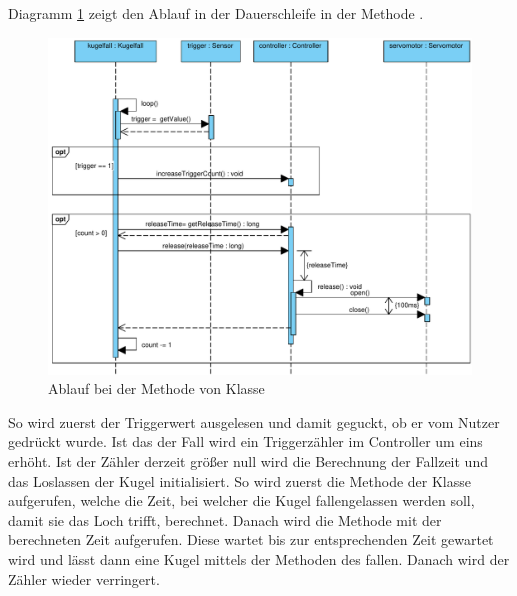 Diagramm \ref{fig:loop_diagram} zeigt den Ablauf in der Dauerschleife in der Methode .
\begin{figure}[htbp]
	\centering
	\includegraphics[width=\textwidth]{abb/loop_cropped}
	\caption{Ablauf bei der Methode  von Klasse }
	\label{fig:loop_diagram}
\end{figure}
So wird zuerst der Triggerwert ausgelesen und damit geguckt, ob er vom Nutzer gedrückt wurde.
Ist das der Fall wird ein Triggerzähler im Controller um eins erhöht.
Ist der Zähler derzeit größer null wird die Berechnung der Fallzeit und das Loslassen der Kugel initialisiert.
So wird zuerst die Methode  der Klasse  aufgerufen, welche die Zeit, bei welcher die Kugel fallengelassen werden soll, damit sie das Loch trifft, berechnet.
Danach wird die Methode  mit der berechneten Zeit aufgerufen.
Diese wartet bis zur entsprechenden Zeit gewartet wird und lässt dann eine Kugel mittels der Methoden des  fallen.
Danach wird der Zähler wieder verringert.

